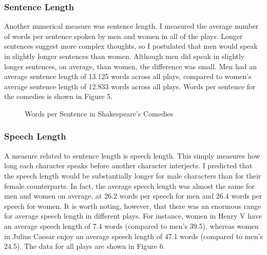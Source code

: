 \documentclass[12pt]{article} %
\begin{document}
\subsubsection{Sentence Length}
Another numerical measure was sentence length. I measured the average number of words per sentence spoken by men and women in all of the plays. Longer sentences suggest more complex thoughts, so I postulated that men would speak in slightly longer sentences than women. Although men did speak in slightly longer sentences, on average, than women, the difference was small. Men had an average sentence length of 13.125 words across all plays, compared to women's average sentence length of 12.833 words across all plays. Words per sentence for the comedies is shown in Figure 5.

\begin{figure}[H] %
\caption{Words per Sentence in Shakespeare's Comedies}
\label{fig:speciation}
\end{figure}





\subsubsection{Speech Length} %
A measure related to sentence length is speech length. This simply measures how long each character speaks before another character interjects. I predicted that the speech length would be substantially longer for male characters than for their female counterparts. In fact, the average speech length was almost the same for men and women on average, at 26.2 words per speech for men and 26.4 words per speech for women. It is worth noting, however, that there was an enormous range for average speech length in different plays. For instance, women in Henry V have an average speech length of 7.4 words (compared to men's 39.5), whereas women in Julius Caesar enjoy an average speech length of 47.1 words (compared to men's 24.5). The data for all plays are shown in Figure 6.
\end{document}
